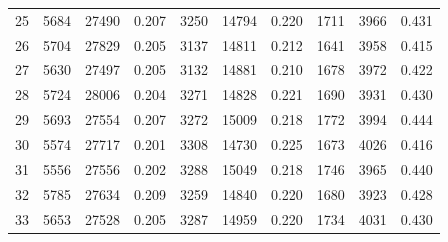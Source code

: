 \begin{table}
\begin{tabular}{c|C{1cm}C{1cm}C{1cm}|C{1cm}C{1cm}C{1cm}|C{1cm}C{1cm}C{1cm}}
25 & 5684 & 27490 & 0.207 & 3250 & 14794 & 0.220 & 1711 & 3966 & 0.431 \\
26 & 5704 & 27829 & 0.205 & 3137 & 14811 & 0.212 & 1641 & 3958 & 0.415 \\
27 & 5630 & 27497 & 0.205 & 3132 & 14881 & 0.210 & 1678 & 3972 & 0.422 \\
28 & 5724 & 28006 & 0.204 & 3271 & 14828 & 0.221 & 1690 & 3931 & 0.430 \\
29 & 5693 & 27554 & 0.207 & 3272 & 15009 & 0.218 & 1772 & 3994 & 0.444 \\
30 & 5574 & 27717 & 0.201 & 3308 & 14730 & 0.225 & 1673 & 4026 & 0.416 \\
31 & 5556 & 27556 & 0.202 & 3288 & 15049 & 0.218 & 1746 & 3965 & 0.440 \\
32 & 5785 & 27634 & 0.209 & 3259 & 14840 & 0.220 & 1680 & 3923 & 0.428 \\
33 & 5653 & 27528 & 0.205 & 3287 & 14959 & 0.220 & 1734 & 4031 & 0.430 \\

\end{tabular}
\end{table}
